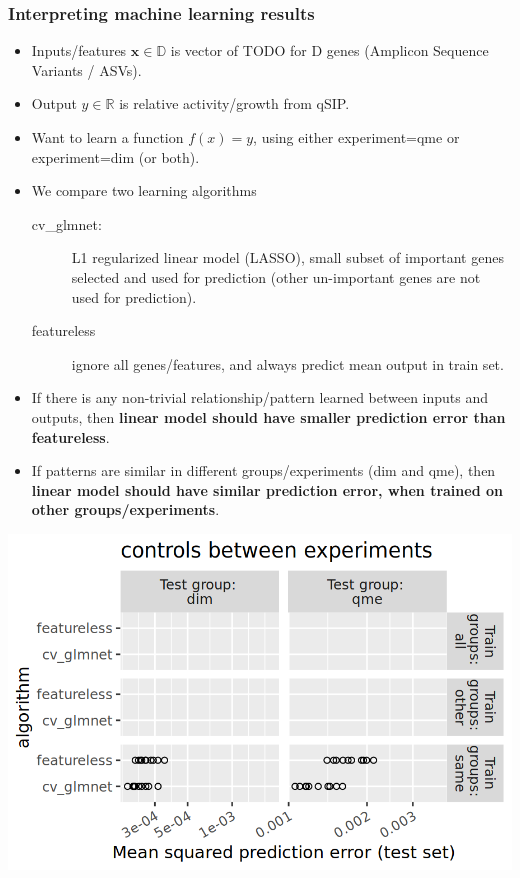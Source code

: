 \documentclass{beamer}
\begin{document}
\begin{frame}
  \frametitle{Interpreting machine learning results}
  \begin{itemize}
  \item Inputs/features $\mathbf x\in\mathbb D$ is vector of TODO for D genes
    (Amplicon Sequence Variants / ASVs).
  \item Output $y\in\mathbb R$ is relative activity/growth from qSIP.
  \item Want to learn a function $f(x)=y$, using either experiment=qme
    or experiment=dim (or both).
  \item We compare two learning algorithms
    \begin{description}
    \item[cv\_glmnet:] L1 regularized linear model (LASSO), small
      subset of important genes selected and used for prediction
      (other un-important genes are not used for prediction).
    \item[featureless] ignore all genes/features, and always predict
      mean output in train set.
    \end{description}
  \item If there is any non-trivial relationship/pattern learned
    between inputs and outputs, then \textbf{linear model should have
      smaller prediction error than featureless}.
  \item If patterns are similar in different groups/experiments (dim
    and qme), then \textbf{linear model should have similar prediction
      error, when trained on other groups/experiments}.
  \end{itemize}
\end{frame}

\begin{frame}
  \includegraphics[width=\textwidth]{qsip_pc2_all_new-controls.between.experiments.same.png}
\end{frame}
\end{document}
